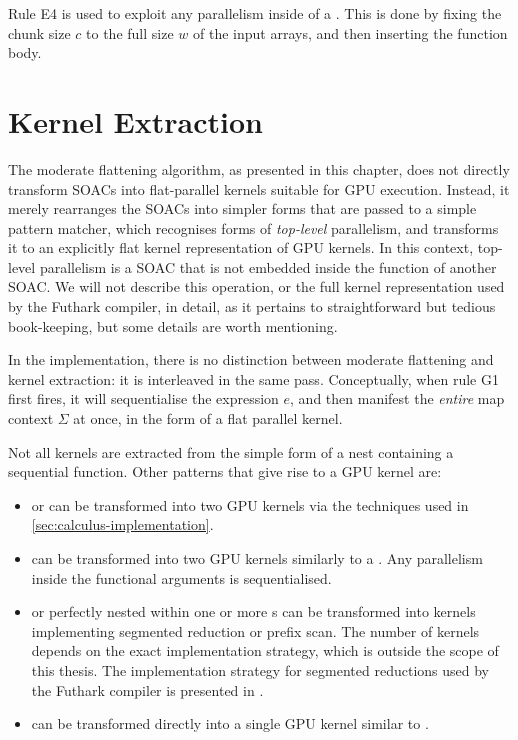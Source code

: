 Rule E4 is used to exploit any parallelism inside of a \StreamSeq{}.
This is done by fixing the chunk size $c$ to the full size $w$ of the
input arrays, and then inserting the function body.

\section{Kernel Extraction}

The moderate flattening algorithm, as presented in this chapter, does
not directly transform SOACs into flat-parallel kernels suitable for
GPU execution.  Instead, it merely rearranges the SOACs into simpler
forms that are passed to a simple pattern matcher, which recognises
forms of \textit{top-level} parallelism, and transforms it to an
explicitly flat kernel representation of GPU kernels.  In this
context, top-level parallelism is a SOAC that is not embedded inside
the function of another SOAC.  We will not describe this operation, or
the full kernel representation used by the Futhark compiler, in
detail, as it pertains to straightforward but tedious book-keeping,
but some details are worth mentioning.

In the implementation, there is no distinction between moderate
flattening and kernel extraction: it is interleaved in the same pass.
Conceptually, when rule G1 first fires, it will sequentialise the
expression $e$, and then manifest the \textit{entire} map context
$\Sigma$ at once, in the form of a flat parallel kernel.

Not all kernels are extracted from the simple form of a  nest
containing a sequential function.  Other patterns that give rise to a
GPU kernel are:

\begin{itemize}
\item {} or  can be transformed into two GPU
  kernels via the techniques used in
  \cref{sec:calculus-implementation}.
\item \StreamPar{} can be transformed into two GPU kernels similarly
  to a .  Any parallelism inside the functional arguments
  is sequentialised.
\item {} or  perfectly nested within one or
  more s can be transformed into kernels implementing
  segmented reduction or prefix scan.  The number of kernels depends
  on the exact implementation strategy, which is outside the scope of
  this thesis.  The implementation strategy for segmented reductions
  used by the Futhark compiler is presented in
  \cite{Futhark:segredomap}.
\item {} can be transformed directly into a single GPU
  kernel similar to .
\end{itemize}

